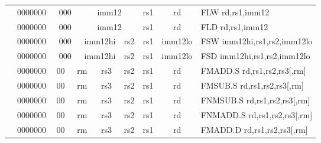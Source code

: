 \begin{table}[p]
\begin{small}
\begin{center}
\begin{tabular}{rcccccccccl}
&
\multicolumn{1}{|c|}{0000000} &
\multicolumn{2}{c|}{000} &
\multicolumn{4}{c|}{imm12} &
\multicolumn{1}{c|}{rs1} &
\multicolumn{1}{c|}{rd} & FLW rd,rs1,imm12 \\
\cline{2-10}
  

&
\multicolumn{1}{|c|}{0000000} &
\multicolumn{2}{c|}{000} &
\multicolumn{4}{c|}{imm12} &
\multicolumn{1}{c|}{rs1} &
\multicolumn{1}{c|}{rd} & FLD rd,rs1,imm12 \\
\cline{2-10}
  

&
\multicolumn{1}{|c|}{0000000} &
\multicolumn{2}{c|}{000} &
\multicolumn{3}{c|}{imm12hi} &
\multicolumn{1}{c|}{rs2} &
\multicolumn{1}{c|}{rs1} &
\multicolumn{1}{c|}{imm12lo} & FSW imm12hi,rs1,rs2,imm12lo \\
\cline{2-10}
  

&
\multicolumn{1}{|c|}{0000000} &
\multicolumn{2}{c|}{000} &
\multicolumn{3}{c|}{imm12hi} &
\multicolumn{1}{c|}{rs2} &
\multicolumn{1}{c|}{rs1} &
\multicolumn{1}{c|}{imm12lo} & FSD imm12hi,rs1,rs2,imm12lo \\
\cline{2-10}
  

&
\multicolumn{1}{|c|}{0000000} &
\multicolumn{1}{c|}{00} &
\multicolumn{2}{c|}{rm} &
\multicolumn{2}{c|}{rs3} &
\multicolumn{1}{c|}{rs2} &
\multicolumn{1}{c|}{rs1} &
\multicolumn{1}{c|}{rd} & FMADD.S rd,rs1,rs2,rs3[,rm] \\
\cline{2-10}
  

&
\multicolumn{1}{|c|}{0000000} &
\multicolumn{1}{c|}{00} &
\multicolumn{2}{c|}{rm} &
\multicolumn{2}{c|}{rs3} &
\multicolumn{1}{c|}{rs2} &
\multicolumn{1}{c|}{rs1} &
\multicolumn{1}{c|}{rd} & FMSUB.S rd,rs1,rs2,rs3[,rm] \\
\cline{2-10}
  

&
\multicolumn{1}{|c|}{0000000} &
\multicolumn{1}{c|}{00} &
\multicolumn{2}{c|}{rm} &
\multicolumn{2}{c|}{rs3} &
\multicolumn{1}{c|}{rs2} &
\multicolumn{1}{c|}{rs1} &
\multicolumn{1}{c|}{rd} & FNMSUB.S rd,rs1,rs2,rs3[,rm] \\
\cline{2-10}
  

&
\multicolumn{1}{|c|}{0000000} &
\multicolumn{1}{c|}{00} &
\multicolumn{2}{c|}{rm} &
\multicolumn{2}{c|}{rs3} &
\multicolumn{1}{c|}{rs2} &
\multicolumn{1}{c|}{rs1} &
\multicolumn{1}{c|}{rd} & FNMADD.S rd,rs1,rs2,rs3[,rm] \\
\cline{2-10}
  

&
\multicolumn{1}{|c|}{0000000} &
\multicolumn{1}{c|}{00} &
\multicolumn{2}{c|}{rm} &
\multicolumn{2}{c|}{rs3} &
\multicolumn{1}{c|}{rs2} &
\multicolumn{1}{c|}{rs1} &
\multicolumn{1}{c|}{rd} & FMADD.D rd,rs1,rs2,rs3[,rm] \\
\cline{2-10}
  


\end{tabular}
\end{center}
\end{small}
\end{table}
